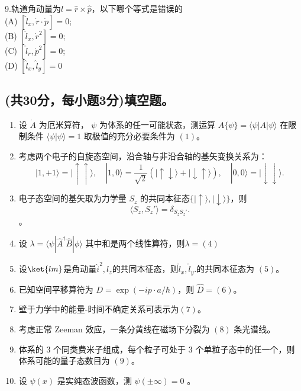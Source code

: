 9.轨道角动量为$\hat{l}=\hat{r}\times \hat{p}$，以下哪个等式是错误的\\
   (A) $[\hat{l}_x, \dot{r} \cdot \dot{p}] = 0$; \\
   (B) $[\hat{l}_x, \dot{r}^2] = 0$; \\
   (C) $[\hat{l}_r, \dot{p}^2] = 0$; \\
   (D) $[\hat{l}_x, \hat{l}_y] = 0$\\

\subsection{(共30分，每小题3分)填空题。}
\begin{enumerate}
    \item 设 $\dot{A}$ 为厄米算符， $\psi$ 为体系的任一可能状态，测运算 $A \{\psi\} = \langle \psi | A | \psi \rangle $ 在限制条件 $\langle \psi | \psi \rangle = 1$ 取极值的充分必要条件为 $(1)$。
    
    \item 考虑两个电子的自旋态空间，沿合轴与非沿合轴的基矢变换关系为：
    \[
    |1, +1\rangle = |\uparrow\uparrow\rangle, \quad |1, 0\rangle = \frac{1}{\sqrt{2}}(|\uparrow\downarrow\rangle + |\downarrow\uparrow\rangle), \quad |0, 0\rangle = |\downarrow\downarrow\rangle.~
    \]
    
    \item 电子态空间的基矢取为力学量 $S_z$ 的共同本征态$\{|\uparrow\rangle, |\downarrow\rangle\}$，则
    \[
    \langle S_z, S_z' \rangle = \delta_{S_z S_z'}.~
    \]。
    
    \item 设 $\lambda=\langle \psi |\hat{A}^\dagger \hat{B} | \phi \rangle$ 其中和是两个线性算符，则$\lambda =(4)$
    
    \item 设$\ket{lm}$是角动量{$\hat{i}^2,l_z$}的共同本征态，则{$\hat{l}_x,\hat{l}_y$}.的共同本征态为 $(5)$。
    
    \item 已知空间平移算符为 $D = \exp(-ip \cdot a/\hbar)$，则 $\hat D = (6)$。
    
    \item 壁于力学中的能量-时间不确定关系可表示为$(7)$。
    
    \item 考虑正常 Zeeman 效应，一条分黄线在磁场下分裂为 $(8)$ 条光谱线。
    
    \item 体系的 3 个同类费米子组成，每个粒子可处于 3 个单粒子态中的任一个，则体系可能的量子态数目为 $(9)$。
    
    \item 设 $\psi(x)$ 是实纯态波函数，测 $\psi(\pm\infty) = 0$ 。
\end{enumerate}

